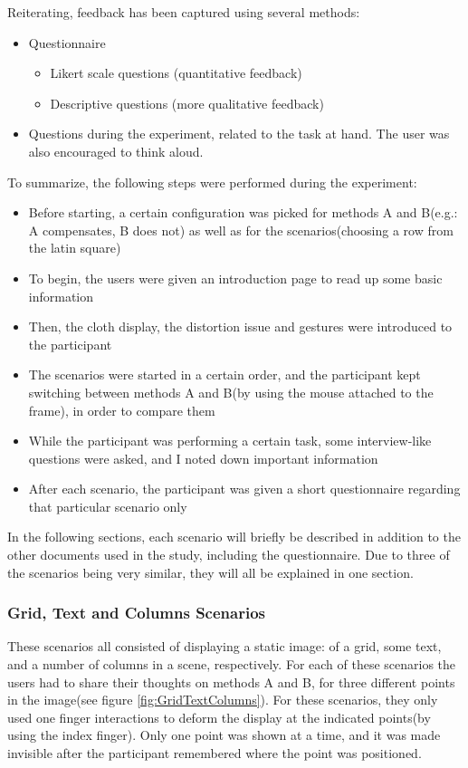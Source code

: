 \documentclass[]{article}
\begin{document}
Reiterating, feedback has been captured using several methods:
\begin{itemize}
\item Questionnaire
\begin{itemize}
\item Likert scale questions (quantitative feedback)
\item Descriptive questions (more qualitative feedback)
\end{itemize}
\item Questions during the experiment, related to the task at hand. The user was also encouraged to think aloud.
\end{itemize}

To summarize, the following steps were performed during the experiment:
\begin{itemize}
\item Before starting, a certain configuration was picked for methods A and B(e.g.: A compensates, B does not) as well as for the scenarios(choosing a row from the latin square)
\item To begin, the users were given an introduction page to read up some basic information
\item Then, the cloth display, the distortion issue and gestures were introduced to the participant
\item The scenarios were started in a certain order, and the participant kept switching between methods A and B(by using the mouse attached to the frame), in order to compare them 
\item While the participant was performing a certain task, some interview-like questions were asked, and I noted down important information
\item After each scenario, the participant was given a short questionnaire regarding that particular scenario only
\end{itemize}

In the following sections, each scenario will briefly be described in addition to the other documents used in the study, including the questionnaire. Due to three of the scenarios being very similar, they will all be explained in one section.

\subsubsection{Grid, Text and Columns Scenarios}

These scenarios all consisted of displaying a static image: of a grid, some text, and a number of columns in a scene, respectively. For each of these scenarios the users had to share their thoughts on methods A and B, for three different points in the image(see figure \ref{fig:GridTextColumns}). For these scenarios, they only used one finger interactions to deform the display at the indicated points(by using the index finger). Only one point was shown at a time, and it was made invisible after the participant remembered where the point was positioned.
\end{document}
